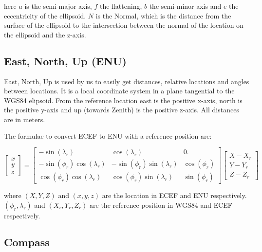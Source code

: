 \noindent
here $a$ is the semi-major axis, $f$ the flattening, $b$ the semi-minor
axis and $e$ the eccentricity of the ellipsoid. $N$ is the Normal, which
is the distance from the surface of the ellipsoid to the intersection
between the normal of the location on the ellipsoid and the z-axis.


\subsection{East, North, Up (ENU)}

East, North, Up is used by us to easily get distances, relative
locations and angles between locations. It is a local coordinate system
in a plane tangential to the WGS84 elipsoid. From the reference location
east is the positive x-axis, north is the positive y-axis and up
(towards Zenith) is the positive z-axis. All distances are in meters.

The formulae to convert ECEF to ENU with a reference position are:

\begin{equation}
    \begin{bmatrix}
    x \\ y \\ z
    \end{bmatrix}
    =
    \begin{bmatrix}
                 -\sin(\lambda_r) &               \cos(\lambda_r) &           0. \\
    -\sin(\phi_r) \cos(\lambda_r) & -\sin(\phi_r) \sin(\lambda_r) & \cos(\phi_r) \\
     \cos(\phi_r) \cos(\lambda_r) &  \cos(\phi_r) \sin(\lambda_r) & \sin(\phi_r)
    \end{bmatrix}
    \begin{bmatrix}
    X - X_r \\ Y - Y_r \\ Z - Z_r
    \end{bmatrix}
\end{equation}

where  $(X, Y, Z)$ and $(x, y, z)$ are the location in ECEF and ENU
respectively. $(\phi_r, \lambda_r)$ and $(X_r, Y_r, Z_r)$ are the
reference position in WGS84 and ECEF respectively.


\subsection{Compass}


